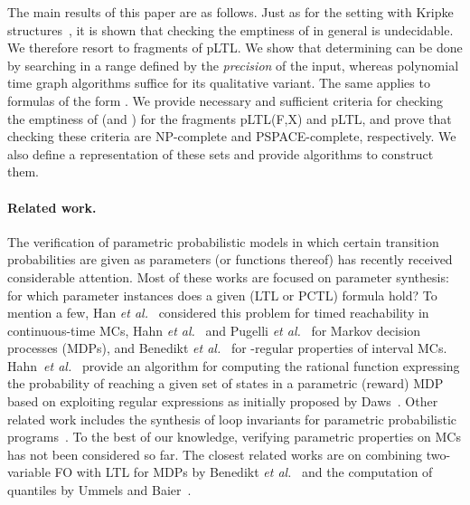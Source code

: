 \documentclass{llncs}
\begin{document}
The main results of this paper are as follows.
Just as for the setting with Kripke structures~\cite{DBLP:journals/tocl/AlurETP01}, it is shown that checking the emptiness of  in 
general is undecidable.
We therefore resort to fragments of pLTL.
We show that determining  can be done by searching in a range defined by the \emph{precision} of the input, 
whereas polynomial time 
graph algorithms suffice for its qualitative variant.
The same applies to formulas of the form .
We provide necessary and sufficient criteria for checking the emptiness of  (and )
for the fragments pLTL(F,X) and pLTL, and prove that checking these criteria are NP-complete and PSPACE-complete, respectively. 
We also define a representation of these sets and provide algorithms to construct them. 



\paragraph{Related work.}
The verification of parametric probabilistic models in which certain transition probabilities are given as parameters (or functions thereof) has recently received 
considerable attention.
Most of these works are focused on parameter synthesis: for which parameter instances does a given (LTL or PCTL) formula hold?
To mention a few, Han \emph{et al.}~\cite{DBLP:conf/rtss/HanKM08} considered this problem for timed reachability in continuous-time MCs, Hahn \emph{et al.}~\cite{DBLP:conf/nfm/HahnHZ11} and
Pugelli \emph{et al.}~\cite{DBLP:conf/cav/Pugelli13} for Markov decision processes (MDPs), and Benedikt \emph{et al.}~\cite{DBLP:conf/tacas/BenediktLW13} for -regular properties of interval MCs.
Hahn~\emph{et al.}~\cite{DBLP:journals/sttt/HahnHZ11} provide an algorithm for computing the rational function expressing the probability of reaching a given set of states in a parametric (reward) MDP based on exploiting regular expressions as initially proposed by Daws~\cite{DBLP:conf/ictac/Daws04}.
Other related work includes the synthesis of loop invariants for parametric probabilistic programs~\cite{DBLP:conf/sas/KatoenMMM10}.
To the best of our knowledge, verifying parametric properties on MCs has not been considered so far.
The closest related works are on combining two-variable FO with LTL for MDPs by Benedikt \emph{et al.}~\cite{DBLP:journals/corr/abs-1303-4533} and 
the computation of quantiles by Ummels and Baier~\cite{DBLP:conf/fossacs/UmmelsB13}.  
\end{document}
